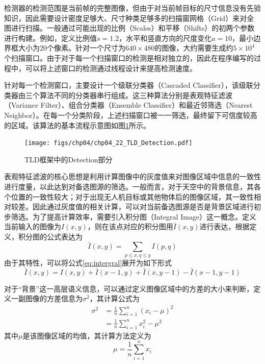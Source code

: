 检测器的检测范围是当前帧的完整图像，但由于对当前帧目标的尺寸信息没有先验知识，因此需要设计密度足够大、尺寸种类足够多的扫描窗网格（Grid）来对全图进行扫描。一般通过可能出现的比例（Scales）和平移（Shifts）的初两个参数进行构建。例如，定义比例值$s=1.2$，水平和竖直方向的尺度变化$a=10$，最小边界框大小为20个像素。针对一个尺寸为$640\times480$的图像，大约需要生成约$5\times10^4$个扫描窗口。由于对于每一个扫描窗口的检测是相对独立的，因此在程序编写的过程中，可以将上述窗口的检测通过线程设计来提高检测速度。

针对每一个检测窗口，主要设计一个级联分类器（Cascaded Classifier），该级联分类器由三个算法不同的分类器串行组成。这三种算法分别是表观特征滤波（Variance Filter）、组合分类器（Ensemble Classifier）和最近邻筛选（Nearest Neighbor）。在每一个分类阶段，上述扫描窗口被一一筛选，最终留下可信度较高的区域。该算法的基本流程示意图如图\ref{fig:chp04_22_TLD_Detection}所示。
\begin{figure}[ht]   
	\centering
	\texttt{[image: figs/chp04/chp04\_22\_TLD\_Detection.pdf]}
	\caption{TLD框架中的Detection部分}
	\label{fig:chp04_22_TLD_Detection}
\end{figure}


表观特征滤波的核心思想是利用计算图像中的灰度值来对图像区域中信息的一致性进行度量，以此达到对备选图源的筛选。一般而言，对于天空中的背景信息，其各个位置的一致性较大；对于出现无人机目标或其他物体后的图像区域，其一致性相对较差。因此通过灰度值的相关计算，可以对当前备选图源是否是背景区域进行初步筛选。为了提高计算效率，需要引入积分图（Integral Image）这一概念。定义当前输入的图像为$I(x,y)$，则在该点对应的积分图用$\bar{I}(x,y) $进行表达，根据定义，积分图的公式表达为
\begin{equation}
\label{eq:intergral}
\bar{I}(x,y) = \sum_{p \le x, q \le y}I(p,q)
\end{equation}
由于其特性，可以将公式\ref{eq:intergral}展开为如下形式
\begin{equation}
\bar{I}(x,y) = I(x,y) + \bar{I}(x-1, y) + \bar{I}(x, y-1) - \bar{I}(x-1, y-1)
\end{equation}

对于“背景”这一高层语义信息，可以通过定义图像区域中的方差的大小来判断，定义一副图像的方差信息为$\sigma^2$，其计算公式为
\begin{align}
\label{eq:variance_integral}
\sigma^2&=\frac{1}{n}\sum_{i=1}^n(x_i-\mu)^2 \\
&=\frac{1}{n}\sum_{i=1}^nx_i^2-\mu^2
\end{align}
其中$\mu$是该图像区域的均值，其计算方法定义为
\begin{equation}
\mu=\frac{1}{n}\sum_{i=1}^nx_i
\end{equation}

